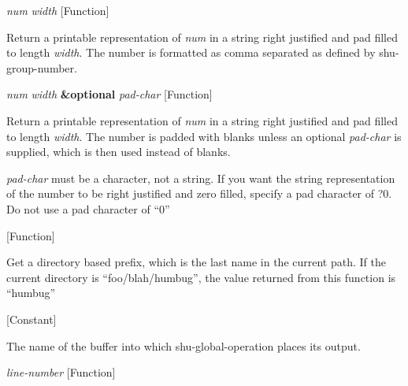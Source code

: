 \vspace{1em}
\noindent
{}
\usebox{\funcname}\emph{num} \emph{width}
 \hfill [Function]

\begin{doc-string}
Return a printable representation of \emph{num} in a string right justified
and pad filled to length \emph{width}.  The number is formatted as comma separated
as defined by shu-group-number.
\end{doc-string}

\vspace{1em}
\noindent
{}
\usebox{\funcname}\emph{num} \emph{width} \textbf{\&optional} \emph{pad-char}
 \hfill [Function]

\begin{doc-string}
Return a printable representation of \emph{num} in a string right justified and pad
filled to length \emph{width}.  The number is padded with blanks unless an optional
\emph{pad-char} is supplied, which is then used instead of blanks.

\emph{pad-char} must be a character, not a string.  If you want the string
representation of the number to be right justified and zero filled, specify a
pad character of ?0.  Do not use a pad character of ``0''
\end{doc-string}

\vspace{1em}
\noindent
{}
\usebox{\funcname}
 \hfill [Function]

\begin{doc-string}
Get a directory based prefix, which is the last name in the current path.  If the current
directory is ``foo/blah/humbug'', the value returned from this function is ``humbug''
\end{doc-string}

\vspace{1em}
\noindent
{}
\usebox{\funcname}
 \hfill [Constant]

\begin{doc-string}
The name of the buffer into which shu-global-operation places its output.
\end{doc-string}

\vspace{1em}
\noindent
{}
\usebox{\funcname}\emph{line-number}
 \hfill [Function]

